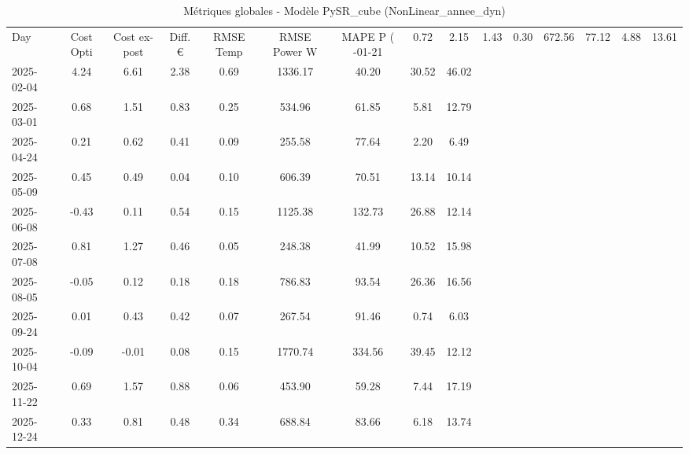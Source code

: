 \begin{table}
\caption{Métriques globales - Modèle PySR_cube (NonLinear_annee_dyn)}
\label{tab:PySR_cube_NonLinear_annee_dyn_Validation_EPlus_VS_Opti}
\begin{small}
\begin{tabular}{lcccccccc}
\toprule
Day & Cost Opti & Cost ex-post & Diff. € & RMSE Temp & RMSE Power W & MAPE P (%
-01-21 & 0.72 & 2.15 & 1.43 & 0.30 & 672.56 & 77.12 & 4.88 & 13.61 \\
2025-02-04 & 4.24 & 6.61 & 2.38 & 0.69 & 1336.17 & 40.20 & 30.52 & 46.02 \\
2025-03-01 & 0.68 & 1.51 & 0.83 & 0.25 & 534.96 & 61.85 & 5.81 & 12.79 \\
2025-04-24 & 0.21 & 0.62 & 0.41 & 0.09 & 255.58 & 77.64 & 2.20 & 6.49 \\
2025-05-09 & 0.45 & 0.49 & 0.04 & 0.10 & 606.39 & 70.51 & 13.14 & 10.14 \\
2025-06-08 & -0.43 & 0.11 & 0.54 & 0.15 & 1125.38 & 132.73 & 26.88 & 12.14 \\
2025-07-08 & 0.81 & 1.27 & 0.46 & 0.05 & 248.38 & 41.99 & 10.52 & 15.98 \\
2025-08-05 & -0.05 & 0.12 & 0.18 & 0.18 & 786.83 & 93.54 & 26.36 & 16.56 \\
2025-09-24 & 0.01 & 0.43 & 0.42 & 0.07 & 267.54 & 91.46 & 0.74 & 6.03 \\
2025-10-04 & -0.09 & -0.01 & 0.08 & 0.15 & 1770.74 & 334.56 & 39.45 & 12.12 \\
2025-11-22 & 0.69 & 1.57 & 0.88 & 0.06 & 453.90 & 59.28 & 7.44 & 17.19 \\
2025-12-24 & 0.33 & 0.81 & 0.48 & 0.34 & 688.84 & 83.66 & 6.18 & 13.74 \\
\bottomrule
\end{tabular}
\end{small}
\end{table}
